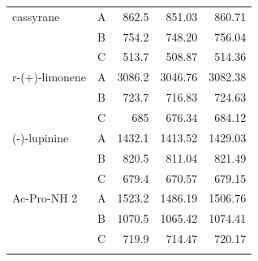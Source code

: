 \documentclass[journal=jctcce,manuscript=article]{achemso}
\begin{document}
\begin{spacing}{1}
\begin{longtable}{llRRR}
    cassyrane & A     & 862.5 & 851.03 & 860.71 \\
          & B     & 754.2 & 748.20 & 756.04 \\
          & C     & 513.7 & 508.87 & 514.36 \\
    r-(+)-limonene & A     & 3086.2 & 3046.76 & 3082.38 \\
          & B     & 723.7 & 716.83 & 724.63 \\
          & C     & 685   & 676.34 & 684.12 \\
    (-)-lupinine & A     & 1432.1 & 1413.52 & 1429.03 \\
          & B     & 820.5 & 811.04 & 821.49 \\
          & C     & 679.4 & 670.57 & 679.15 \\
    Ac-Pro-NH 2 & A     & 1523.2 & 1486.19 & 1506.76 \\
          & B     & 1070.5 & 1065.42 & 1074.41 \\
          & C     & 719.9 & 714.47 & 720.17 \\
    \hline
  \label{tab:pbe_rot34}
\end{longtable}%


\end{spacing}
\end{document}
